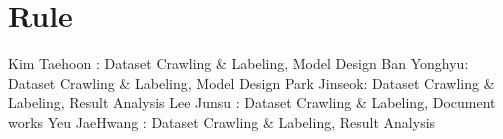 \documentclass{article}
\begin{document}
\section{Rule}
Kim Taehoon : Dataset Crawling \& Labeling, Model Design \newline
Ban Yonghyu: Dataset Crawling \& Labeling, Model Design \newline
Park Jinseok: Dataset Crawling \& Labeling, Result Analysis \newline
Lee Junsu : Dataset Crawling \& Labeling, Document works \newline
Yeu JaeHwang : Dataset Crawling \& Labeling, Result Analysis \newline




\end{document}

